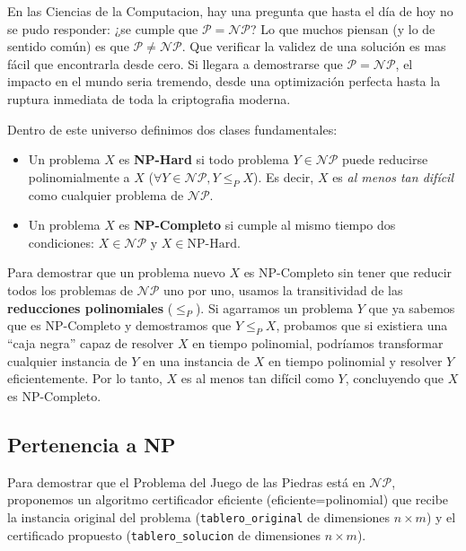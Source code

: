 En las Ciencias de la Computacion, hay una pregunta que hasta el día de hoy no se pudo responder: ¿se cumple que $\mathcal{P} = \mathcal{NP}$? Lo que muchos piensan (y lo de sentido común) es que $\mathcal{P} \neq \mathcal{NP}$. Que verificar la validez de una solución es mas fácil que encontrarla desde cero. Si llegara a demostrarse que $\mathcal{P} = \mathcal{NP}$, el impacto en el mundo seria tremendo, desde una optimización perfecta hasta la ruptura inmediata de toda la criptografia moderna.

Dentro de este universo definimos dos clases fundamentales:
\begin{itemize}
    \item Un problema $X$ es \textbf{NP-Hard} si todo problema $Y \in \mathcal{NP}$ puede reducirse polinomialmente a $X$ ($\forall Y \in \mathcal{NP}, Y \leq_P X$). Es decir, $X$ es \textit{al menos tan difícil} como cualquier problema de $\mathcal{NP}$.
    \item Un problema $X$ es \textbf{NP-Completo} si cumple al mismo tiempo dos condiciones: $X \in \mathcal{NP}$ y $X \in \text{NP-Hard}$.
\end{itemize}

Para demostrar que un problema nuevo $X$ es NP-Completo sin tener que reducir todos los problemas de $\mathcal{NP}$ uno por uno, usamos la transitividad de las \textbf{reducciones polinomiales} ($\leq_P$). Si agarramos un problema $Y$ que ya sabemos que es NP-Completo y demostramos que $Y \leq_P X$, probamos que si existiera una ``caja negra'' capaz de resolver $X$ en tiempo polinomial, podríamos transformar cualquier instancia de $Y$ en una instancia de $X$ en tiempo polinomial y resolver $Y$ eficientemente. Por lo tanto, $X$ es al menos tan difícil como $Y$, concluyendo que $X$ es NP-Completo.

\subsection{Pertenencia a NP}

Para demostrar que el Problema del Juego de las Piedras está en $\mathcal{NP}$, proponemos un algoritmo certificador eficiente (eficiente=polinomial) que recibe la instancia original del problema (\texttt{tablero\_original} de dimensiones $n \times m$) y el certificado propuesto (\texttt{tablero\_solucion} de dimensiones $n \times m$).

